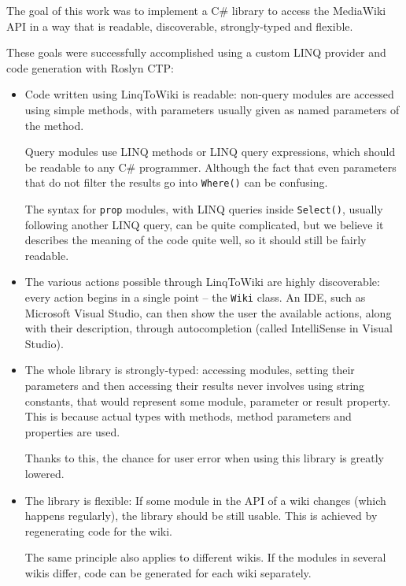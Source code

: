 \label{conclusion}

The goal of this work was to implement a C\# library to access the MediaWiki \ac{API}
in a way that is readable, discoverable, strongly-typed and flexible.

These goals were successfully accomplished using a custom \acs{LINQ} provider and code generation with Roslyn \ac{CTP}:

\begin{itemize}
\item Code written using LinqToWiki is readable:
non-query modules are accessed using simple methods,
with parameters usually given as named parameters of the method.

Query modules use \acs{LINQ} methods or \acs{LINQ} query expressions,
which should be readable to any C\# programmer.
Although the fact that even parameters that do not filter the results go into \lstinline{Where()} can be confusing.

The syntax for \texttt{prop} modules, with \acs{LINQ} queries inside \lstinline{Select()},
usually following another \acs{LINQ} query, can be quite complicated,
but we believe it describes the meaning of the code quite well,
so it should still be fairly readable.

\item The various actions possible through LinqToWiki are highly discoverable:
every action begins in a single point – the \lstinline{Wiki} class.
An \ac{IDE}, such as Microsoft Visual Studio,
can then show the user the available actions, along with their description,
through autocompletion (called IntelliSense in Visual Studio).

\item The whole library is strongly-typed:
accessing modules, setting their parameters and then accessing their results
never involves using string constants,
that would represent some module, parameter or result property.
This is because actual types with methods, method parameters and properties are used.

Thanks to this, the chance for user error when using this library is greatly lowered.

\item The library is flexible: If some module in the \ac{API} of a wiki changes
(which happens regularly), the library should be still usable.
This is achieved by regenerating code for the wiki.

The same principle also applies to different wikis.
If the modules in several wikis differ, code can be generated for each wiki separately.
\end{itemize}

